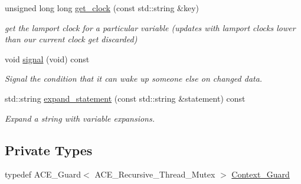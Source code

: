 \begin{DoxyCompactItemize}
unsigned long long \hyperlink{classMadara_1_1Knowledge__Engine_1_1Thread__Safe__Context_a3166fceae673dccddb7366c73a3fabea}{get\_\-clock} (const std::string \&key)
\begin{DoxyCompactList}\small\item\em get the lamport clock for a particular variable (updates with lamport clocks lower than our current clock get discarded) \item\end{DoxyCompactList}\item 
void \hyperlink{classMadara_1_1Knowledge__Engine_1_1Thread__Safe__Context_a16e8d93461a3ed73a2893be3d95b1ed3}{signal} (void) const 
\begin{DoxyCompactList}\small\item\em Signal the condition that it can wake up someone else on changed data. \item\end{DoxyCompactList}\item 
std::string \hyperlink{classMadara_1_1Knowledge__Engine_1_1Thread__Safe__Context_acacddbfcb23fbb92e8683eedcb6f1d08}{expand\_\-statement} (const std::string \&statement) const 
\begin{DoxyCompactList}\small\item\em Expand a string with variable expansions. \item\end{DoxyCompactList}\end{DoxyCompactItemize}
\subsection*{Private Types}
\begin{DoxyCompactItemize}
\item 
typedef ACE\_\-Guard$<$ ACE\_\-Recursive\_\-Thread\_\-Mutex $>$ \hyperlink{classMadara_1_1Knowledge__Engine_1_1Thread__Safe__Context_a57064d7990248bc355b119159fa627d1}{Context\_\-Guard}
\end{DoxyCompactItemize}
